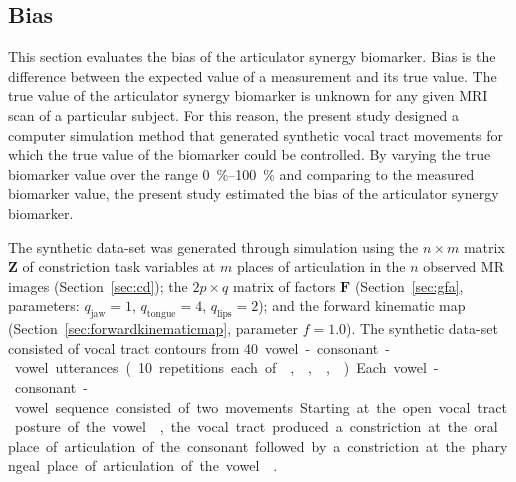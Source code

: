 \documentclass[reprint]{JASAnew}\usepackage[]{graphicx}\usepackage[]{color}
\begin{document}
\subsection{Bias}
\label{subsec:bias}

This section evaluates the bias of the articulator synergy biomarker. Bias is the difference between the expected value of a measurement and its true value. The true value of the articulator synergy biomarker is unknown for any given MRI scan of a particular subject. For this reason, the present study designed a computer simulation method that generated synthetic vocal tract movements for which the true value of the biomarker could be controlled. By varying the true biomarker value over the range \SIrange{0}{100}{\percent} and comparing to the measured biomarker value, the present study estimated the bias of the articulator synergy biomarker.

The synthetic data-set was generated through simulation using the $n\times m$ matrix $\mathbf{Z}$ of constriction task variables at $m$ places of articulation in the $n$ observed MR images (Section~\ref{sec:cd}); the $2p\times q$ matrix of factors $\mathbf{F}$ (Section~\ref{sec:gfa}, parameters: $q_\text{jaw}=1$, $q_\text{tongue}=4$, $q_\text{lips}=2$); and the forward kinematic map (Section~\ref{sec:forwardkinematicmap}, parameter $f=1.0$). 
The synthetic data-set consisted of vocal tract contours from \SI{40} vowel-consonant-vowel utterances (\SI{10}~repetitions each of \textipa{[apa]}, \textipa{[ata]}, \textipa{[aja]}, \textipa{[aka]}). 
Each vowel-consonant-vowel sequence consisted of two movements. Starting at the open vocal tract posture of the vowel \textipa{[a]}, the vocal tract produced a constriction at the oral place of articulation of the consonant followed by a constriction at the pharyngeal place of articulation of the vowel \textipa{[a]}~\citep{wood1979radiographic}.
\end{document}
